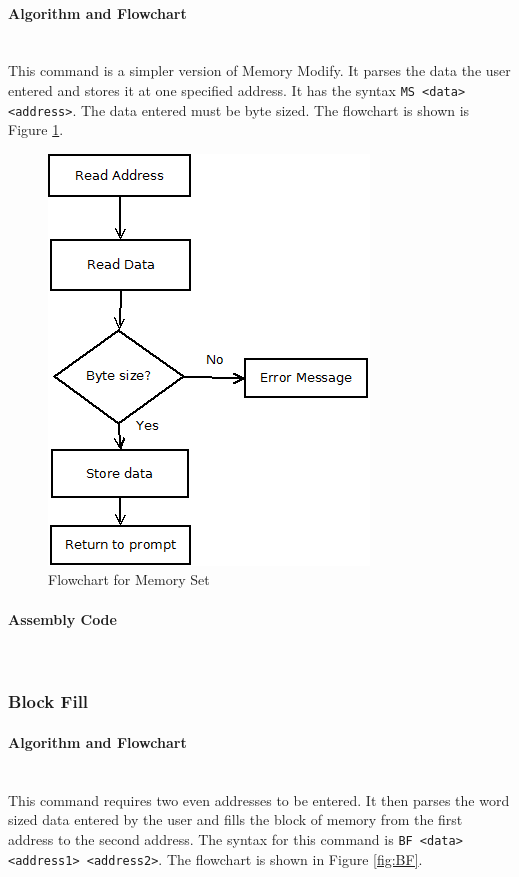 \documentclass[12pt]{article}
\begin{document}
			\paragraph{Algorithm and Flowchart}~\\
			This command is a simpler version of Memory Modify. It parses the data the user entered and stores it at one specified address. It has the syntax \texttt{MS <data> <address>}. The data entered must be byte sized. The flowchart is shown is Figure \ref{fig:MS}.
			
			
\begin{figure}[H]
\centering
\includegraphics[width=0.7\linewidth]{MS}
\caption{Flowchart for Memory Set}
\label{fig:MS}
\end{figure}
			\paragraph{Assembly Code}~\\
			
			\subsubsection{Block Fill}
			\paragraph{Algorithm and Flowchart}~\\
			This command requires two even addresses to be entered. It then parses the word sized data entered by the user and fills the block of memory from the first address to the second address. The syntax for this command is \texttt{BF <data> <address1> <address2>}. The flowchart is shown in Figure \ref{fig:BF}.
			
\end{document}
